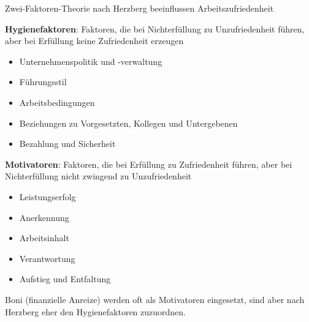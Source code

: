 \begin{concept}{Zwei-Faktoren-Theorie nach Herzberg} beeinflussen Arbeitszufriedenheit

    \textbf{Hygienefaktoren}: Faktoren, die bei Nichterfüllung zu Unzufriedenheit führen, aber bei Erfüllung keine Zufriedenheit erzeugen
    \begin{itemize}
        \item Unternehmenspolitik und -verwaltung
        \item Führungsstil
        \item Arbeitsbedingungen
        \item Beziehungen zu Vorgesetzten, Kollegen und Untergebenen
        \item Bezahlung und Sicherheit
    \end{itemize}
\textbf{Motivatoren}: Faktoren, die bei Erfüllung zu Zufriedenheit führen, aber bei Nichterfüllung nicht zwingend zu Unzufriedenheit
    \begin{itemize}
        \item Leistungserfolg
        \item Anerkennung
        \item Arbeitsinhalt
        \item Verantwortung
        \item Aufstieg und Entfaltung
    \end{itemize}

Boni (finanzielle Anreize) werden oft als Motivatoren eingesetzt, sind aber nach Herzberg eher den Hygienefaktoren zuzuordnen.
\end{concept}

